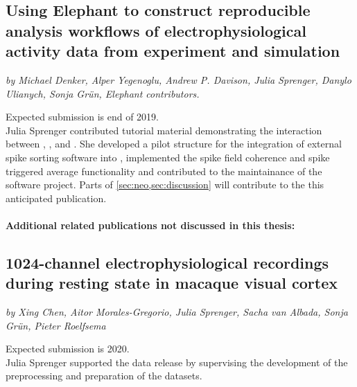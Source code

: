 \clearpage
\subsection*{Using Elephant to construct reproducible analysis workflows of electrophysiological activity data from experiment and simulation}
\textit{by Michael Denker, Alper Yegenoglu, Andrew P. Davison, Julia Sprenger, Danylo Ulianych, Sonja Grün, Elephant contributors.}

Expected submission is end of 2019.\\

Julia Sprenger contributed tutorial material demonstrating the interaction between , ,  and . She developed a pilot structure for the integration of external spike sorting software into , implemented the spike field coherence and spike triggered average functionality and contributed to the maintainance of the software project. Parts of \cref{sec:neo,sec:discussion} will contribute to the this anticipated publication.\\

\vspace{2cm}

\paragraph{Additional related publications not discussed in this thesis:}
\subsection*{1024-channel electrophysiological recordings during resting state in macaque visual cortex}
\textit{by Xing Chen, Aitor Morales-Gregorio, Julia Sprenger, Sacha van Albada, Sonja Grün, Pieter Roelfsema}

Expected submission is 2020.\\

Julia Sprenger supported the data release by supervising the development of the preprocessing and preparation of the datasets.

\hypersetup{pageanchor=true} %
